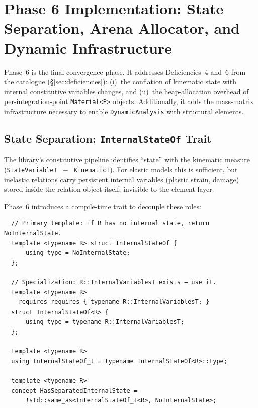 
\section{Phase 6 Implementation: State Separation, Arena Allocator, and Dynamic Infrastructure}
\label{sec:phase6-state-arena}

Phase~6 is the final convergence phase.  It addresses Deficiencies~4 and~6
from the catalogue (\S\ref{sec:deficiencies}): (i)~the conflation of
kinematic state with internal constitutive variables changes, and (ii)~the
heap-allocation overhead of per-integration-point \texttt{Material<P>}
objects.  Additionally, it adds the mass-matrix infrastructure necessary
to enable \texttt{DynamicAnalysis} with structural elements.

\subsection{State Separation: \texttt{InternalStateOf} Trait}

The library's constitutive pipeline identifies ``state'' with the
kinematic measure (\texttt{StateVariableT $\equiv$ KinematicT}).
For elastic models this is sufficient, but inelastic relations carry
persistent internal variables (plastic strain, damage) stored inside
the relation object itself, invisible to the element layer.

Phase~6 introduces a compile-time trait to decouple these roles:

\begin{verbatim}
  // Primary template: if R has no internal state, return NoInternalState.
  template <typename R> struct InternalStateOf {
      using type = NoInternalState;
  };

  // Specialization: R::InternalVariablesT exists → use it.
  template <typename R>
    requires requires { typename R::InternalVariablesT; }
  struct InternalStateOf<R> {
      using type = typename R::InternalVariablesT;
  };

  template <typename R>
  using InternalStateOf_t = typename InternalStateOf<R>::type;

  template <typename R>
  concept HasSeparatedInternalState =
      !std::same_as<InternalStateOf_t<R>, NoInternalState>;
\end{verbatim}

